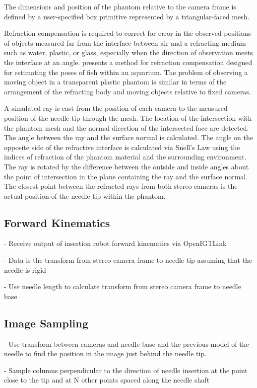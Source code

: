 The dimensions and position of the phantom relative to the camera frame is defined by a user-specified box primitive represented by a triangular-faced mesh.

Refraction compensation is required to correct for error in the observed positions of objects measured far from the interface between air and a refracting medium such as water, plastic, or glass, especially when the direction of observation meets the interface at an angle. \cite{Muller2014Refraction} presents a method for refraction compensation designed for estimating the poses of fish within an aquarium. The problem of observing a moving object in a transparent plastic phantom is similar in terms of the arrangement of the refracting body and moving objects relative to fixed cameras.

A simulated ray is cast from the position of each camera to the measured position of the needle tip through the mesh. The location of the intersection with the phantom mesh and the normal direction of the intersected face are detected. The angle between the ray and the surface normal is calculated. The angle on the opposite side of the refractive interface is calculated via Snell's Law using the indices of refraction of the phantom material and the surrounding environment. The ray is rotated by the difference between the outside and inside angles about the point of intersection in the plane containing the ray and the surface normal. The closest point between the refracted rays from both stereo cameras is the actual position of the needle tip within the phantom.

\subsection{Forward Kinematics}
- Receive output of insertion robot forward kinematics via OpenIGTLink

- Data is the transform from stereo camera frame to needle tip assuming that the needle is rigid

- Use needle length to calculate transform from stereo camera frame to needle base


\subsection{Image Sampling}
- Use transform between cameras and needle base and the previous model of the needle to find the position in the image just behind the needle tip.

- Sample columns perpendicular to the direction of needle insertion at the point close to the tip and at N other points spaced along the needle shaft

